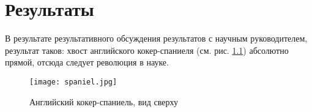 \chapter{Результаты}
\label{results}

В результате результативного обсуждения результатов с научным руководителем, результат таков: хвост английского кокер-спаниеля (см. рис. \ref{spaniel}) абсолютно прямой, отсюда следует революция в науке.

\begin{figure}[H]
      \centering
      \texttt{[image: spaniel.jpg]}
      \caption{Английский кокер-спаниель, вид сверху~\cite{wiki:aks}}
      \label{spaniel}
\end{figure}

